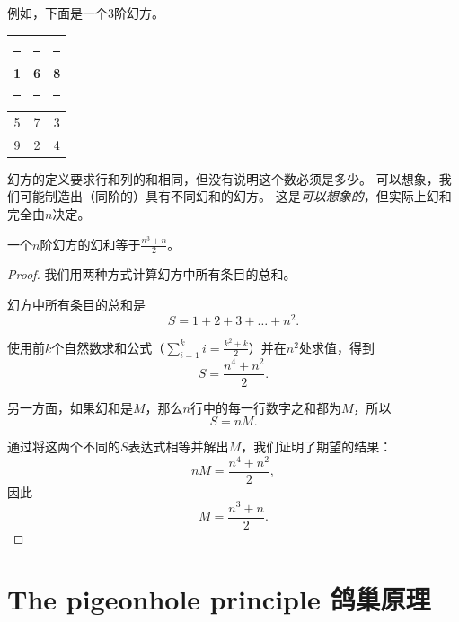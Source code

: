 例如，下面是一个3阶幻方。

\begin{center}
\begin{tabular}{c|c|c}
\rule[-4pt]{0pt}{20pt}\rule{5pt}{0pt} 1 \rule{5pt}{0pt} & \rule{5pt}{0pt} 6 \rule{5pt}{0pt} & \rule{5pt}{0pt} 8 \rule{5pt}{0pt} \\ \hline
\rule[-4pt]{0pt}{20pt} 5 & 7 & 3 \\ \hline
\rule[-4pt]{0pt}{20pt} 9 & 2 & 4 \\
\end{tabular}
\end{center}

幻方的定义要求行和列的和相同，但没有说明这个数必须是多少。
可以想象，我们可能制造出（同阶的）具有不同幻和的幻方。
这是\emph{可以想象的}，但实际上幻和完全由$n$决定。

\begin{thm}
一个$n$阶幻方的幻和等于$\displaystyle\frac{n^3+n}{2}$。
\end{thm}

\begin{proof}
我们用两种方式计算幻方中所有条目的总和。

幻方中所有条目的总和是
\[ S = 1 + 2 + 3 + \ldots + n^2. \]

使用前$k$个自然数求和公式（$\sum_{i=1}^k i = \frac{k^2+k}{2}$）并在$n^2$处求值，得到
\[ S = \frac{n^4 + n^2}{2}. \]

另一方面，如果幻和是$M$，那么$n$行中的每一行数字之和都为$M$，所以
\[ S = nM. \]

通过将这两个不同的$S$表达式相等并解出$M$，我们证明了期望的结果：
\[ nM = \frac{n^4 + n^2}{2}, \]
\noindent 因此
\[ M = \frac{n^3 + n}{2}. \]
\end{proof}


\clearpage




\clearpage

\section{The pigeonhole principle 鸽巢原理}
\label{sec:pigeonhole}

